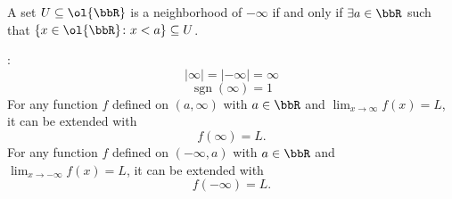 \documentclass[a4paper,12pt]{article}
\begin{document}
A set $U\subseteq\ol{\bbR}$ is a neighborhood of $-\infty$ if and only if $\exists a\in\bbR$ such that $\{x\in\ol{\bbR}\colon x<a\}\subseteq U$.
\item {}:
\[|\infty|=|-\infty|=\infty\]
\[\operatorname{sgn}(\infty)=1\]
For any function $f$ defined on $(a,\infty)$ with $a\in\bbR$ and $\lim_{x\to\infty}f(x)=L$, it can be extended with
\[f(\infty)=L.\]
For any function $f$ defined on $(-\infty,a)$ with $a\in\bbR$ and $\lim_{x\to-\infty}f(x)=L$, it can be extended with
\[f(-\infty)=L.\]
\eit
\end{document}
